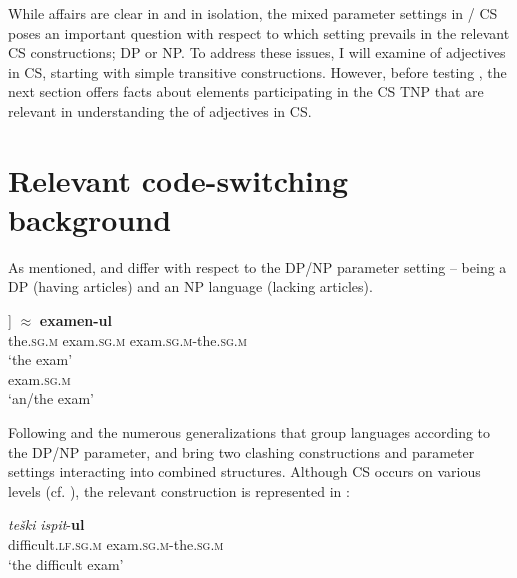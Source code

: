 \documentclass[output=paper,hidelinks,newtxmath,]{langscibook}
\begin{document}
\noindent While affairs are clear in  and  in isolation, the mixed parameter settings in / CS poses an important question with respect to which setting prevails in the relevant CS constructions; DP or NP. To address these issues, I will examine  of adjectives in CS, starting with simple transitive constructions. However, before testing , the next section offers facts about elements participating in the CS TNP that are relevant in understanding the  of adjectives in CS.

\section{Relevant code-switching background}\label{15:s4}

As mentioned,  and  differ with respect to the DP/NP parameter setting --  being a DP (having articles) and  an NP language (lacking articles).

\ea \label{15:ex9}
	\ea\label{15:ex9a}
    \gll [\textsubscript{DP} \textbf{{}-ul} [\textsubscript{NP} \textbf{examen}]]\hspace{0.6cm} $\approx$\hspace{0.7cm} \textbf{examen-ul}\\          
         {} the\textsc{.sg.m} {} exam\textsc{.sg.m} {} exam\textsc{.sg.m}-the.\textsc{sg.m}\\
         \glt `the exam'
	\ex\label{15:ex9b}
    \\
         {} exam\textsc{.sg.m}\\ 
         \glt `an/the exam'
         
	\z
\z

\noindent Following \citet{Boskovic2008,Boskovic2012} and the numerous generalizations that group languages according to the DP/NP parameter,  and  bring two clashing constructions and parameter settings interacting into combined structures. Although CS occurs on various levels (cf. \citealt{Petroj}), the relevant construction is represented in :

\ea \label{15:ex10}
\gll  \textit{teški} \textit{ispit}{}-\textbf{ul}\\
     difficult.\textsc{lf.sg.m} exam\textsc{.sg.m}-the\textsc{.sg.m}\\
     \glt `the difficult exam'
\z
\end{document}
